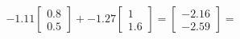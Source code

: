\documentclass[preview]{standalone}
\begin{document}
\begin{align*}
-1.11 \begin{bmatrix} 0.8 \\ 0.5 \end{bmatrix} + -1.27 \begin{bmatrix} 1 \\ 1.6 \end{bmatrix} = \begin{bmatrix} -2.16 \\ -2.59 \end{bmatrix} =
\end{align*}
\end{document}
